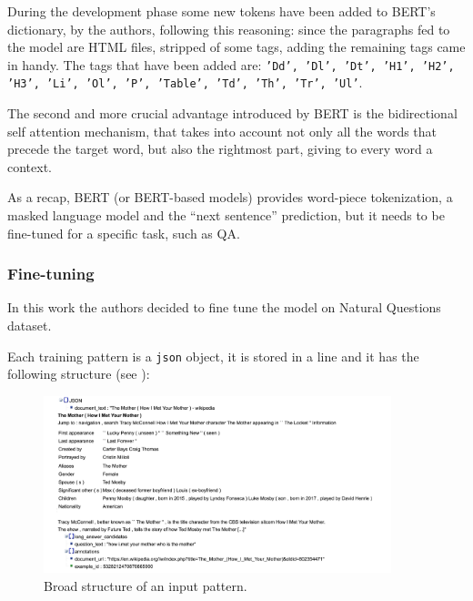 \documentclass[10pt,hidelinks]{article}
\begin{document}
During the development phase some new tokens have been added to BERT's dictionary, by the authors, following this reasoning: since the paragraphs fed to the model are HTML files, stripped of some tags, adding the remaining tags came in handy. The tags that have been added are: \texttt{'Dd', 'Dl', 'Dt', 'H1', 'H2', 'H3', 'Li', 'Ol', 'P', 'Table', 'Td', 'Th', 'Tr', 'Ul'}.

The second and more crucial advantage introduced by BERT is the bidirectional self attention mechanism, that takes into account not only all the words that precede the target word, but also the rightmost part, giving to every word a context.


As a recap, BERT (or BERT-based models) provides word-piece tokenization, a masked language model and  the ``next sentence'' prediction, but it needs to be fine-tuned for a specific task, such as QA.

\subsubsection{Fine-tuning}\label{subsubsec:finetuning}
In this work the authors decided to fine tune the model on Natural Questions dataset.

Each training pattern is a \texttt{json} object, it is stored in a line and it has the following structure (see ):

\begin{figure}[ht!]
	\centering
	\includegraphics[width=0.9\textwidth]{pics/json_cut.png}
	\caption{Broad structure of an input pattern.}\label{fig:json}
\end{figure}
\end{document}
